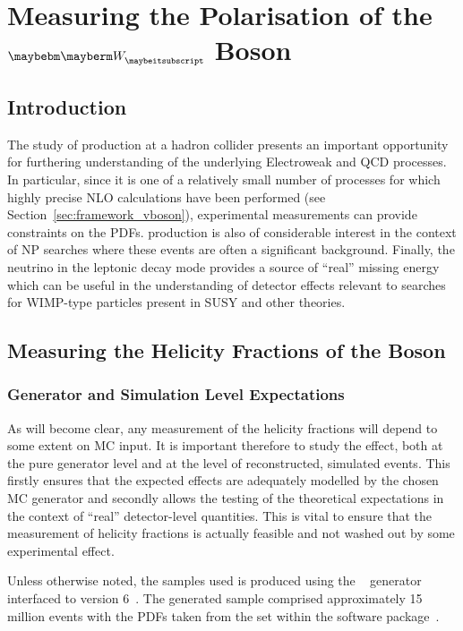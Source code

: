 \chapter{Measuring the Polarisation of the \texorpdfstring{$\PW$}{W} Boson}
\label{sec:wpol}
\section{Introduction}
The study of \Wjets production at a hadron collider presents an important
opportunity for furthering understanding of the underlying Electroweak and
\ac{QCD} processes. In particular, since it is one of a relatively small number
of processes for which highly precise \ac{NLO} calculations have been performed
(see Section~\ref{sec:framework_vboson}), experimental measurements can provide
constraints on the \acp{PDF}. \Wjets production is also of considerable interest
in the context of \ac{NP} searches where these events are often a significant
background. Finally, the neutrino in the leptonic decay mode provides a source
of ``real'' missing energy which can be useful in the understanding of detector
effects relevant to searches for \acs{WIMP}-type particles present in \ac{SUSY}
and other theories.

\section{Measuring the Helicity Fractions of the \texorpdfstring{\PW}{W} Boson}
\subsection{Generator and Simulation Level Expectations}
As will become clear, any measurement of the helicity fractions will depend to
some extent on \acl{MC} input. It is important therefore to study the effect,
both at the pure generator level and at the level of reconstructed, simulated
events. This firstly ensures that the expected effects are adequately modelled
by the chosen \ac{MC} generator and secondly allows the testing of the
theoretical expectations in the context of ``real'' detector-level
quantities. This is vital to ensure that the measurement of helicity fractions
is actually feasible and not washed out by some experimental effect.

Unless otherwise noted, the \Wjets samples used is produced using the
\madgraph~\cite{madgraph} generator interfaced to \pythia version
6~\cite{pythia}. The generated sample comprised approximately 15 million events
with the \acp{PDF} taken from the \cteqsixlone set within the \lhapdf software
package~\cite{lhapdf, lhapdf_web}.


